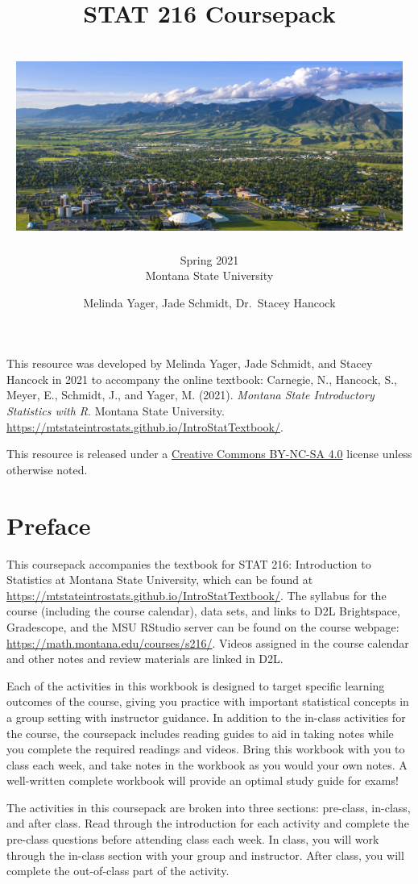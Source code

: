 \documentclass[
]{report}
\title{\textbf{STAT 216 Coursepack}\\
~\\
\includegraphics[width=5in,height=\textheight]{images/msu-campus.jpg}}
\subtitle{Spring 2021\\
Montana State University}
\author{Melinda Yager, Jade Schmidt, Dr.~Stacey Hancock}
\date{}
\begin{document}
\maketitle

\newpage
\thispagestyle{empty}

This resource was developed by Melinda Yager, Jade Schmidt, and Stacey Hancock in 2021 to accompany the online textbook: Carnegie, N., Hancock, S., Meyer, E., Schmidt, J., and Yager, M. (2021). \emph{Montana State Introductory Statistics with R}. Montana State University. \url{https://mtstateintrostats.github.io/IntroStatTextbook/}.

This resource is released under a \href{https://creativecommons.org/licenses/by-nc-sa/4.0/}{Creative Commons BY-NC-SA 4.0} license unless otherwise noted.

\setcounter{tocdepth}{1}
\tableofcontents
\setcounter{page}{1}

\newpage

\hypertarget{preface}{%
\chapter*{Preface}\label{preface}}

This coursepack accompanies the textbook for STAT 216: Introduction to Statistics at Montana State University, which can be found at \url{https://mtstateintrostats.github.io/IntroStatTextbook/}. The syllabus for the course (including the course calendar), data sets, and links to D2L Brightspace, Gradescope, and the MSU RStudio server can be found on the course webpage: \url{https://math.montana.edu/courses/s216/}.
Videos assigned in the course calendar and other notes and review materials are linked in D2L.

Each of the activities in this workbook is designed to target specific learning outcomes of the course, giving you practice with important statistical concepts in a group setting with instructor guidance. In addition to the in-class activities for the course, the coursepack includes reading guides to aid in taking notes while you complete the required readings and videos. Bring this workbook with you to class each week, and take notes in the workbook as you would your own notes. A well-written complete workbook will provide an optimal study guide for exams!

The activities in this coursepack are broken into three sections: pre-class, in-class, and after class. Read through the introduction for each activity and complete the pre-class questions before attending class each week. In class, you will work through the in-class section with your group and instructor. After class, you will complete the out-of-class part of the activity.
\end{document}
